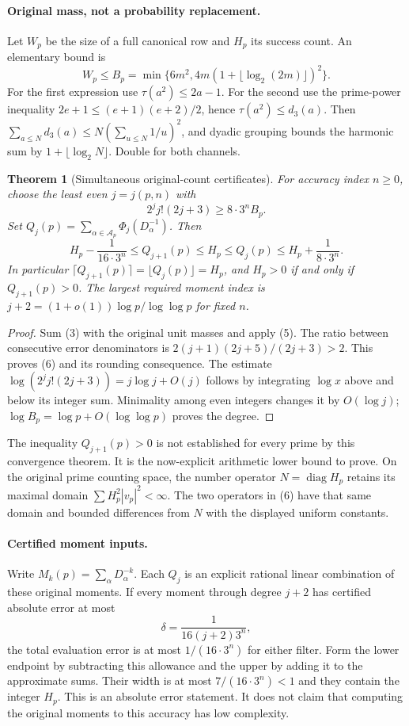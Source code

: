 \documentclass[10pt,a4paper]{article}
\newtheorem{theorem}{Theorem}
\begin{document}
\paragraph{Original mass, not a probability replacement.}
Let $W_p$ be the size of a full canonical row and $H_p$ its success count.
An elementary bound is
\[
 W_p\le B_p=\min\{6m^2,4m(1+\lfloor\log_2(2m)\rfloor)^2\}.
 \tag{5}
\]
For the first expression use $\tau(a^2)\le2a-1$. For the second use the
prime-power inequality $2e+1\le(e+1)(e+2)/2$, hence $\tau(a^2)\le d_3(a)$.
Then $\sum_{a\le N}d_3(a)\le N(\sum_{u\le N}1/u)^2$, and dyadic grouping
bounds the harmonic sum by $1+\lfloor\log_2N\rfloor$. Double for both channels.

\begin{theorem}[Simultaneous original-count certificates]
For accuracy index $n\ge0$, choose the least even $j=j(p,n)$ with
\[
 2^j j!(2j+3)\ge8\cdot3^nB_p.
\]
Set $Q_j(p)=\sum_{\alpha\in\mathcal A_p}\Phi_j(D_\alpha^{-1})$. Then
\[
 \boxed{H_p-\frac1{16\cdot3^n}\le Q_{j+1}(p)\le H_p
 \le Q_j(p)\le H_p+\frac1{8\cdot3^n}.}
 \tag{6}
\]
In particular $\lceil Q_{j+1}(p)\rceil=\lfloor Q_j(p)\rfloor=H_p$, and
$H_p>0$ if and only if $Q_{j+1}(p)>0$. The largest required moment index is
$j+2=(1+o(1))\log p/\log\log p$ for fixed $n$.
\end{theorem}
\begin{proof}
Sum (3) with the original unit masses and apply (5).
The ratio between consecutive error denominators is
$2(j+1)(2j+5)/(2j+3)>2$. This proves (6) and its rounding consequence.
The estimate $\log(2^j j!(2j+3))=j\log j+O(j)$ follows by integrating
$\log x$ above and below its integer sum. Minimality among even integers
changes it by $O(\log j)$; $\log B_p=\log p+O(\log\log p)$ proves the degree.
\end{proof}
The inequality $Q_{j+1}(p)>0$ is not established for every prime by this
convergence theorem. It is the now-explicit arithmetic lower bound to prove.
On the original prime counting space, the number operator $N=\operatorname{diag}H_p$
retains its maximal domain $\sum H_p^2|v_p|^2<\infty$.
The two operators in (6) have that same domain and bounded differences from
$N$ with the displayed uniform constants.

\newpage
\paragraph{Certified moment inputs.}
Write $M_k(p)=\sum_\alpha D_\alpha^{-k}$. Each $Q_j$ is an explicit rational
linear combination of these original moments. If every moment through degree
$j+2$ has certified absolute error at most
\[
 \delta=\frac1{16(j+2)3^n},
\]
the total evaluation error is at most $1/(16\cdot3^n)$ for either filter.
Form the lower endpoint by subtracting this allowance and the upper by adding
it to the approximate sums. Their width is at most $7/(16\cdot3^n)<1$ and they
contain the integer $H_p$. This is an absolute error statement. It does not
claim that computing the original moments to this accuracy has low complexity.
\end{document}
